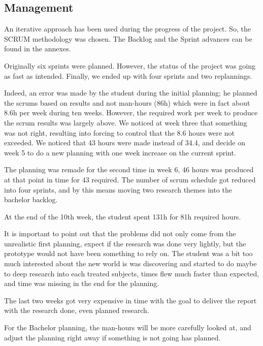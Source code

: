 
\subsection{Management}
An iterative approach has been used during the progress of the project. So, the SCRUM methodology was chosen. The Backlog and the Sprint advances can be found in the annexes.

Originally six sprints were planned. However, the status of the project was going as fast as intended. Finally, we ended up with four sprints and two replannings.

Indeed, an error was made by the student during the initial planning; he planned the scrums based on results and not man-hours (86h) which were in fact about 8.6h per week during ten weeks. However, the required work per week to produce the scrum results was largely above. We noticed at week three that something was not right, resulting into forcing to control that the 8.6 hours were not exceeded. We noticed that 43 hours were made instead of 34.4, and decide on week 5 to do a new planning with one week increase on the current sprint.

The planning was remade for the second time in week 6, 46 hours was produced at that point in time for 43 required. The number of scrum schedule got reduced into four sprints, and by this means moving two research themes into the bachelor backlog.

At the end of the 10th week, the student spent 131h for 81h required hours.

It is important to point out that the problems did not only come from the unrealistic first planning, expect if the research was done very lightly, but the prototype would not have been something to rely on. The student was a bit too much interested about the new world is was discovering and started to do maybe to deep research into each treated subjects, times flew much faster than expected, and time was missing in the end for the planning.

The last two weeks got very expensive in time with the goal to deliver the report with the research done, even planned research.

For the Bachelor planning, the man-hours will be more carefully looked at, and adjust the planning right away if something is not going has planned.


